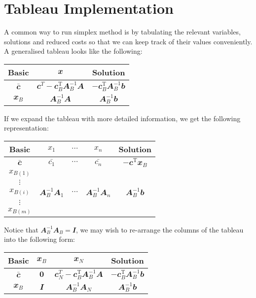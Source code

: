 \documentclass[math, code]{amznotes}
\theoremstyle{remark}
\begin{document}
\section{Tableau Implementation}
A common way to run simplex method is by tabulating the relevant variables, solutions and reduced costs so that we can keep track of their values conveniently. A generalised tableau looks like the following:
\begin{center}
    \begin{tabular}{|c|c|c|}
        \hline
        Basic & $\mathbfit{x}$ & Solution \\
        \hline
        $\mathbfit{\bar{c}}$ & $\mathbfit{c}^{T} - \mathbfit{c}_B^{\mathrm{T}}\mathbfit{A}_B^{-1}\mathbfit{A}$ & $-\mathbfit{c}_B^{\mathrm{T}}\mathbfit{A}_B^{-1}\mathbfit{b}$ \\
        \hline
        $\mathbfit{x}_B$ & $\mathbfit{A}_B^{-1}\mathbfit{A}$ & $\mathbfit{A}_B^{-1}\mathbfit{b}$ \\
        \hline
    \end{tabular}
\end{center}
If we expand the tableau with more detailed information, we get the following representation:
\begin{center}
    \begin{tabular}{|c|ccc|c|}
        \hline
        Basic & $x_1$ & $\cdots$ & $x_n$ & Solution \\
        \hline
        $\mathbfit{\bar{c}}$ & $\bar{c_1}$ & $\cdots$ & $\bar{c_n}$ & $-\mathbfit{c}^{\mathrm{T}}\mathbfit{x}_B$ \\
        \hline
        $x_{B(1)}$ & & & & \\
        $\vdots$ & & & & \\
        $x_{B(i)}$ & $\mathbfit{A}_B^{-1}\mathbfit{A}_1$ & $\cdots$ & $\mathbfit{A}_B^{-1}\mathbfit{A}_n$ & $\mathbfit{A}_B^{-1}\mathbfit{b}$ \\
        $\vdots$ & & & & \\
        $x_{B(m)}$ & & & & \\
        \hline
    \end{tabular}
\end{center}
Notice that $\mathbfit{A}_B^{-1}\mathbfit{A}_B = \mathbfit{I}$, we may wish to re-arrange the columns of the tableau into the following form:
\begin{center}
    \begin{tabular}{|c|cc|c|}
        \hline
        Basic & $\mathbfit{x}_B$ & $\mathbfit{x}_N$ & Solution \\
        \hline
        $\mathbfit{\bar{c}}$ & $\mathbf{0}$ & $\mathbfit{c}_N^{T} - \mathbfit{c}_B^{\mathrm{T}}\mathbfit{A}_B^{-1}\mathbfit{A}$ & $-\mathbfit{c}_B^{\mathrm{T}}\mathbfit{A}_B^{-1}\mathbfit{b}$ \\
        \hline
        $\mathbfit{x}_B$ & $\mathbfit{I}$ & $\mathbfit{A}_B^{-1}\mathbfit{A}_N$ & $\mathbfit{A}_B^{-1}\mathbfit{b}$ \\
        \hline
    \end{tabular}
\end{center}
\end{document}
